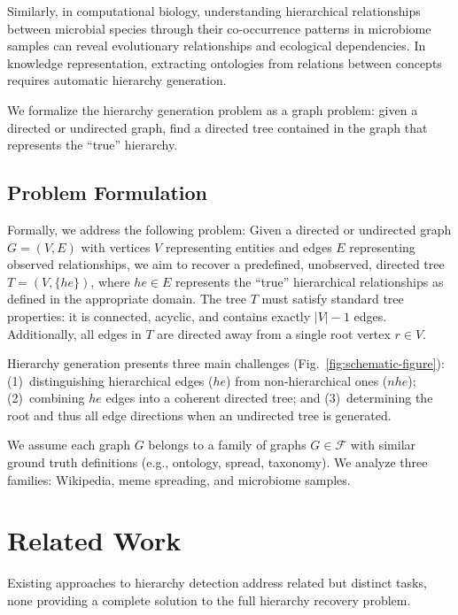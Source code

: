 \documentclass{article}
\begin{document}
    Similarly, in computational biology, understanding hierarchical relationships between microbial species through their co-occurrence patterns in microbiome samples can reveal evolutionary relationships and ecological dependencies. In knowledge representation, extracting ontologies from relations between concepts requires automatic hierarchy generation.

    We formalize the hierarchy generation problem as a graph problem: given a directed or undirected graph, find a directed tree contained in the graph that represents the ``true'' hierarchy.

    \subsection{Problem Formulation}
    Formally, we address the following problem: Given a directed or undirected graph $G = (V, E)$ with vertices $V$ representing entities and edges $E$ representing observed relationships, we aim to recover a predefined, unobserved, directed tree $T = (V, \{he\})$, where $he\in E$ represents the ``true'' hierarchical relationships as defined in the appropriate domain. The tree $T$ must satisfy standard tree properties: it is connected, acyclic, and contains exactly $|V|-1$ edges. Additionally, all edges in $T$ are directed away from a single root vertex $r \in V$.

    Hierarchy generation presents three main challenges (Fig.~\ref{fig:schematic-figure}): (1)~distinguishing hierarchical edges ($he$) from non-hierarchical ones ($nhe$); (2)~combining $he$ edges into a coherent directed tree; and (3)~determining the root and thus all edge directions when an undirected tree is generated.

    We assume each graph $G$ belongs to a family of graphs $G \in \mathcal{F}$ with similar ground truth definitions (e.g., ontology, spread, taxonomy). We analyze three families: Wikipedia, meme spreading, and microbiome samples.
    \section{Related Work}
    Existing approaches to hierarchy detection address related but distinct tasks, none providing a complete solution to the full hierarchy recovery problem.
\end{document}
